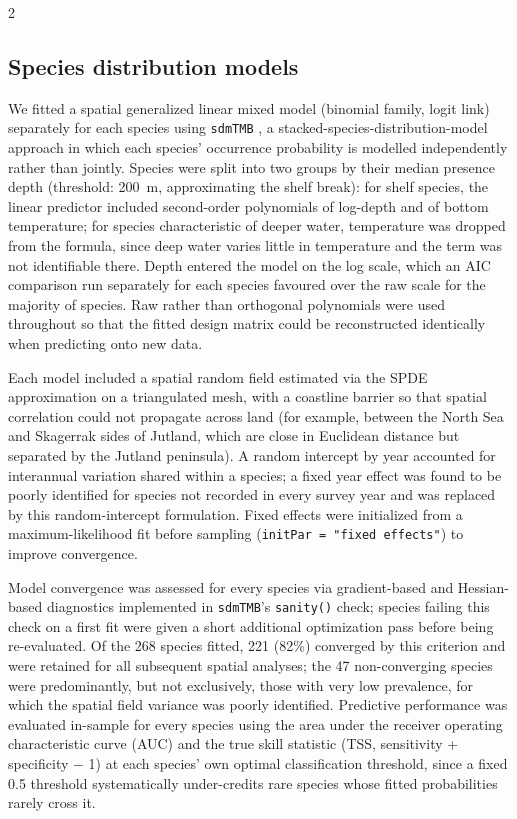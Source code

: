 \begin{spacing}{2}
\subsection{Species distribution models}
We fitted a spatial generalized linear mixed model (binomial family, logit link) separately for each species using \texttt{sdmTMB} \citep{andersonSdmTMB2024}, a stacked-species-distribution-model approach in which each species' occurrence probability is modelled independently rather than jointly. Species were split into two groups by their median presence depth (threshold: 200~m, approximating the shelf break): for shelf species, the linear predictor included second-order polynomials of log-depth and of bottom temperature; for species characteristic of deeper water, temperature was dropped from the formula, since deep water varies little in temperature and the term was not identifiable there. Depth entered the model on the log scale, which an AIC comparison run separately for each species favoured over the raw scale for the majority of species. Raw rather than orthogonal polynomials were used throughout so that the fitted design matrix could be reconstructed identically when predicting onto new data.

Each model included a spatial random field estimated via the SPDE approximation on a triangulated mesh, with a coastline barrier \citep{bakkaBarrierSPDE2019} so that spatial correlation could not propagate across land (for example, between the North Sea and Skagerrak sides of Jutland, which are close in Euclidean distance but separated by the Jutland peninsula). A random intercept by year accounted for interannual variation shared within a species; a fixed year effect was found to be poorly identified for species not recorded in every survey year and was replaced by this random-intercept formulation. Fixed effects were initialized from a maximum-likelihood fit before sampling (\texttt{initPar = "fixed effects"}) to improve convergence.

Model convergence was assessed for every species via gradient-based and Hessian-based diagnostics implemented in \texttt{sdmTMB}'s \texttt{sanity()} check; species failing this check on a first fit were given a short additional optimization pass before being re-evaluated. Of the 268 species fitted, 221 (82\%) converged by this criterion and were retained for all subsequent spatial analyses; the 47 non-converging species were predominantly, but not exclusively, those with very low prevalence, for which the spatial field variance was poorly identified. Predictive performance was evaluated in-sample for every species using the area under the receiver operating characteristic curve (AUC) and the true skill statistic (TSS, sensitivity + specificity $-$ 1) at each species' own optimal classification threshold, since a fixed 0.5 threshold systematically under-credits rare species whose fitted probabilities rarely cross it.


\end{spacing}
